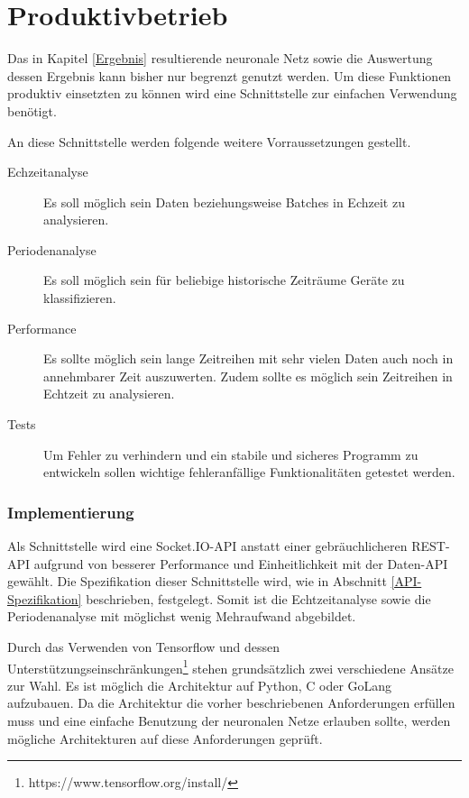 \chapter{Produktivbetrieb}
    Das in Kapitel \ref{Ergebnis} resultierende neuronale Netz sowie die Auswertung dessen Ergebnis kann bisher nur begrenzt genutzt werden.
    Um diese Funktionen produktiv einsetzten zu können wird eine Schnittstelle zur einfachen Verwendung benötigt.
    
    An diese Schnittstelle werden folgende weitere Vorraussetzungen gestellt.
    \begin{description}
        \item[Echzeitanalyse] Es soll möglich sein Daten beziehungsweise Batches in Echzeit zu analysieren.
        \item[Periodenanalyse] Es soll möglich sein für beliebige historische Zeiträume Geräte zu klassifizieren.
        \item[Performance] Es sollte möglich sein lange Zeitreihen mit sehr vielen Daten auch noch in annehmbarer Zeit auszuwerten. Zudem sollte es möglich sein Zeitreihen in Echtzeit zu analysieren.
        \item[Tests] Um Fehler zu verhindern und ein stabile und sicheres Programm zu entwickeln sollen wichtige fehleranfällige Funktionalitäten getestet werden.
    \end{description}
    
    \subsection{Implementierung}
        Als Schnittstelle wird eine Socket.IO-API anstatt einer gebräuchlicheren REST-API aufgrund von besserer Performance und Einheitlichkeit mit der Daten-API gewählt.
        Die Spezifikation dieser Schnittstelle wird, wie in Abschnitt \ref{API-Spezifikation} beschrieben, festgelegt. 
        Somit ist die Echtzeitanalyse sowie die Periodenanalyse mit möglichst wenig Mehraufwand abgebildet.
        \newline

        Durch das Verwenden von Tensorflow und dessen Unterstützungseinschränkungen\footnote{https://www.tensorflow.org/install/} stehen grundsätzlich zwei verschiedene Ansätze zur Wahl.
        Es ist möglich die Architektur auf Python, C oder GoLang aufzubauen.
        Da die Architektur die vorher beschriebenen Anforderungen erfüllen muss und eine einfache Benutzung der neuronalen Netze erlauben sollte, werden mögliche Architekturen auf diese Anforderungen geprüft.
        \newline

